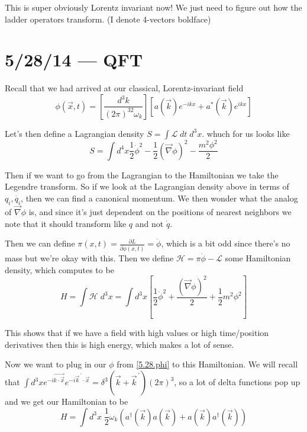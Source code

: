 \documentclass[10pt]{report}
\newcommand{\pd}[2]{\frac{\partial #1}{\partial#2}}
\newcommand{\pvec}[1]{\vec{#1}^{\,\prime}}
\begin{document}
This is super obviously Lorentz invariant now! We just need to figure out how the ladder operators transform. (I denote 4-vectors boldface)

\chapter{5/28/14 --- QFT}

Recall that we had arrived at our classical, Lorentz-invariant field
\begin{equation}
    \phi(\vec{x},t) = \left[ \frac{d^3k}{\left( 2\pi \right)^32\omega_k} \right]\left[ a(\vec{k}) e^{-ikx} + a^*(\vec{k})e^{ikx}\right]\label{5.28.phi}
\end{equation}

Let's then define a Lagrangian density $S = \int \mathcal{L}\; dt\; d^3x$. whuch for us looks like
\begin{equation}
    S = \int d^4x \frac{1}{2}\dot{\phi}^2 - \frac{1}{2}\left( \vec{\nabla}\phi \right)^2 - \frac{m^2\phi^2}{2}
\end{equation}

Then if we want to go from the Lagrangian to the Hamiltonian we take the Legendre transform. So if we look at the Lagrangian density above in terms of $q_i, \dot{q_i}$, then we can find a canonical momentum. We then wonder what the analog of $\vec{\nabla}\phi$ is, and since it's just dependent on the positions of nearest neighbors we note that it should transform like $q$ and not $\dot{q}$. 

Then we can define $\pi(x,t) = \pd{L}{\dot{\phi}(x,t)} = \dot{\phi}$, which is a bit odd since there's no mass but we're okay with this. Then we define $\mathcal{H} = \pi\dot{\phi} - \mathcal{L}$ some Hamiltonian density, which computes to be
\begin{equation}
    H = \int \mathcal{H}\; d^3x = \int d^3x \left[ \frac{1}{2}\dot{\phi}^2 + \frac{(\vec{\nabla}\phi)^2}{2} + \frac{1}{2}m^2\phi^2 \right]
\end{equation}

This shows that if we have a field with high values or high time/position derivatives then this is high energy, which makes a lot of sense.

Now we want to plug in our $\phi$ from \eqref{5.28.phi} to this Hamiltonian. We will recall that $\int d^3x e^{-i\vec{k\cdot \vec{x}}}e^{-i\pvec{k} \cdot \vec{x}} = \delta^3(\vec{k} + \pvec{k})(2\pi)^3$, so a lot of delta functions pop up and we get our Hamiltonian to be
\begin{equation}
    H = \int d^3x\; \frac{1}{2}\omega_k\left( a^\dagger(\vec{k})a(\vec{k}) + a(\vec{k}) a^\dagger(\vec{k}) \right)
\end{equation}
\end{document}
